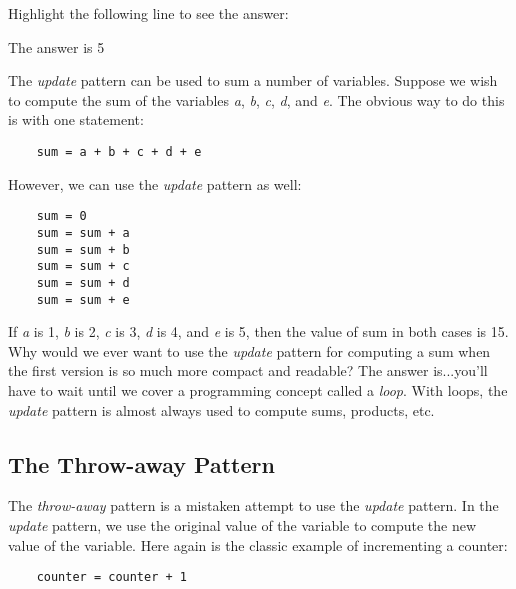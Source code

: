 Highlight the following line to see the answer:

\begin{center}
    The answer is {\color{white} 5}
\end{center}

The {\it update} pattern can be used to sum a number of
variables. Suppose we wish to compute the sum of the
variables {\it a}, {\it b}, {\it c}, {\it d}, and {\it e}.
The obvious way to do this is with one statement:

\color{CodeGreen}
\begin{codesize}
\begin{verbatim}
    sum = a + b + c + d + e
\end{verbatim}
\end{codesize}
\color{black}

However, we can use the {\it update} pattern as well:

\color{CodeGreen}
\begin{codesize}
\begin{verbatim}
    sum = 0
    sum = sum + a
    sum = sum + b
    sum = sum + c
    sum = sum + d
    sum = sum + e
\end{verbatim}
\end{codesize}
\color{black}

If {\it a} is 1, {\it b} is 2, {\it c} is 3, {\it d} is 4, and {\it e} is 5,
then the value of sum in both cases is 15.
Why would we ever want to use the {\it update} pattern for
computing a sum when the
first version is so much more compact and readable? The
answer is...you'll have to wait until we cover a programming
concept called a {\it loop}. With loops, the {\it update} pattern
is almost always used to compute sums, products, etc.

\subsection{The Throw-away Pattern}

The {\it throw-away} pattern is a mistaken attempt to use
the {\it update} pattern. In the {\it update} pattern, we use
the original value of the variable to compute the
new value of the variable. Here again is the
classic example of incrementing a counter:

\color{CodeGreen}
\begin{codesize}
\begin{verbatim}
    counter = counter + 1
\end{verbatim}
\end{codesize}
\color{black}


